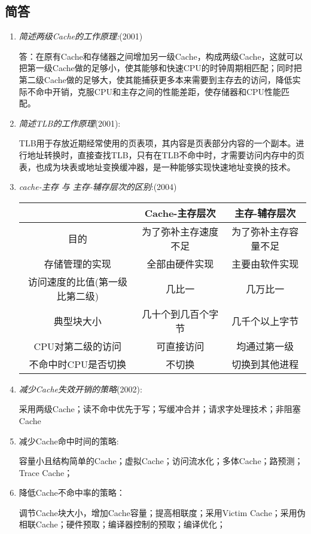 \documentclass[a4paper]{ctexart}
\begin{document}
\subsection{简答}
\begin{enumerate}
  \item \emph{简述两级Cache的工作原理:}(2001)
  
  答：在原有Cache和存储器之间增加另一级Cache，构成两级Cache，这就可以把第一级Cache做的足够小，使其能够和快速CPU的时钟周期相匹配；同时把第二级Cache做的足够大，使其能捕获更多本来需要到主存去的访问，降低实际不命中开销，克服CPU和主存之间的性能差距，使存储器和CPU性能匹配。

  \item \emph{简述TLB的工作原理}(2001):
  
  TLB用于存放近期经常使用的页表项，其内容是页表部分内容的一个副本。进行地址转换时，直接查找TLB，只有在TLB不命中时，才需要访问内存中的页表，也成为块表或地址变换缓冲器，是一种能够实现快速地址变换的技术。
  
  \item \emph{cache-主存 与 主存-辅存层次的区别}:(2004)
  \begin{table}[!hbp]
    \centering
    \begin{tabular}{c|c|c}
      \hline
      &Cache-主存层次&主存-辅存层次 \\
      \hline  
      目的&为了弥补主存速度不足&为了弥补主存容量不足\\
      \hline
      存储管理的实现&全部由硬件实现&主要由软件实现\\
      \hline
      访问速度的比值(第一级比第二级)&几比一&几万比一\\
      \hline
      典型块大小&几十个到几百个字节&几千个以上字节\\
      \hline
      CPU对第二级的访问&可直接访问&均通过第一级\\
      \hline
      不命中时CPU是否切换&不切换&切换到其他进程\\
      \hline
    \end{tabular}  
  \end{table}
  
        
  \item \emph{减少Cache失效开销的策略}(2002):

  采用两级Cache；读不命中优先于写；写缓冲合并；请求字处理技术；非阻塞Cache
  \item 减少Cache命中时间的策略:
  
  容量小且结构简单的Cache；虚拟Cache；访问流水化；多体Cache；路预测；Trace Cache；
  \item 降低Cache不命中率的策略：
  
  调节Cache块大小，增加Cache容量；提高相联度；采用Victim Cache；采用伪相联Cache；硬件预取；编译器控制的预取；编译优化；
\end{enumerate}
\end{document}
